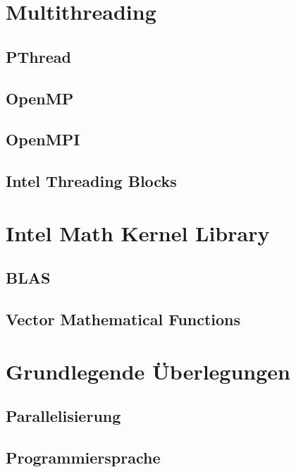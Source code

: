 \documentclass[../main.tex]{subfiles}
\begin{document}
\section{Multithreading}

\subsection{PThread}

\subsection{OpenMP}

\subsection{OpenMPI}

\subsection{Intel Threading Blocks}



\section{Intel Math Kernel Library}

\subsection{BLAS}

\subsection{Vector Mathematical Functions}



\section{Grundlegende Überlegungen}

\subsection{Parallelisierung}

\subsection{Programmiersprache}
\end{document}
